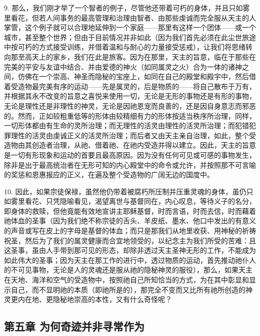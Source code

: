 9. 那么，我们刚才举了一个智者的例子，尽管他还带着可朽的身体，并且只如雾里看花，但若人间事务的最高管理和治理由智者、由那些虔诚而完全服从天主的人掌管，这个例子就可以合理地延伸到一个家庭——那里有这样一个团体——或一个城市，甚至整个世界；但由于目前情况并非如此（因为我们首先必须在此尘世旅途中按可朽的方式接受训练，并借着温和与耐心的力量接受惩戒），让我们将思绪转向那至高天上的家乡，我们在此是旅客。因为在那里，天主的旨意，临在于那些在完美的平安与友谊中结合、并由爱德的神火（如同属灵之火）合为一体的诸神之间，仿佛在一个崇高、神圣而隐秘的宝座上，如同在自己的殿堂和殿宇中，然后借着受造物最完美有序的运动——先是属灵的，后是物质的——将自己散布于万有，并根据其永不改变的旨意之喜悦来使用一切，无论是无形的事物还是有形的事物，无论是理性还是非理性的神灵，无论是因祂恩宠而良善的，还是因自身意志而邪恶的。然而，正如较粗重低等的形体由较精细有力的形体按适当秩序所治理，同样，一切形体都由有生命的灵所治理；而无理性的活灵由理性的活灵所治理；而犯错犯罪理性的活灵由虔诚正义的活灵所治理；而后者又由天主亲自治理，如此，整个受造物由其创造者治理，从祂、借着祂、在祂内受造并得以建立。因此，天主的旨意是一切有形现象和运动的首要且最高原因。因为没有任何可见或可感的事物发生，除非是出于最高统治者在无形可知的内心殿堂中的命令或允许，并按照那不可言喻的奖惩和恩惠报应的正义，在遍及整个受造物的广阔无边的国度中。\par

10. 因此，如果宗徒保禄，虽然他仍带着被腐朽所压制并压重灵魂的身体，虽仍只如雾里看花、只凭隐喻看见，渴望离世与基督同在，内心叹息，等待义子的名分，即身体的救赎，但他竟能有效地宣讲主耶稣基督，时而言语，时而去信，时而藉着祂体血的圣事（因为我们绝不称宗徒的舌头、羊皮纸、墨水、他口中发出的有意义的声音或写在皮上的字母是基督的体血；而只是那我们从地里收获、用神秘的祈祷祝圣，然后为了我们的属灵健康而合宜地领受的，以纪念主为我们所受的苦难：且这圣事，虽由人手带到那可见的形态，却除非透过天主圣神无形的工作，不能成为如此伟大的圣事；因为天主在那工作的进行中，透过物质的运动，首先推动祂仆人的不可见事物，无论是人的灵魂还是服从祂的隐秘神灵的服役），那么，如果天主在天地、海洋和空气的受造物中，按照祂自己所知恰当的方式，为在其中彰显和显示自己，而不显明祂的本质（即祂所是的），那完全不变而又比所有祂所创造的神灵更内在地、更隐秘地崇高的本性，又有什么奇怪呢？\par


\subsection{第五章 为何奇迹并非寻常作为}

